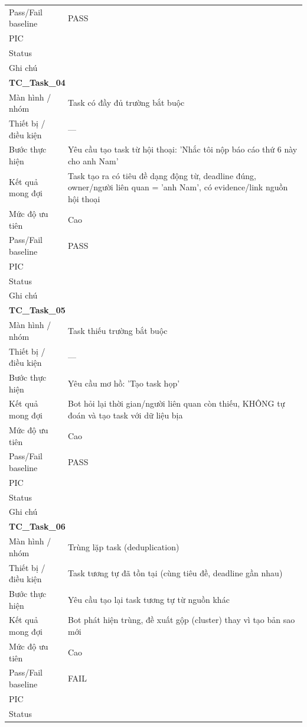 \documentclass[12pt,a4paper]{article}
\begin{document}
\begin{longtable}{p{3.0cm}p{11.5cm}}
Pass/Fail baseline & PASS \\
PIC &  \\
Status &  \\
Ghi chú &  \\
\midrule
\multicolumn{2}{l}{\textbf{TC\_Task\_04}} \\
Màn hình / nhóm & Task có đầy đủ trường bắt buộc \\
Thiết bị / điều kiện & — \\
Bước thực hiện & Yêu cầu tạo task từ hội thoại: 'Nhắc tôi nộp báo cáo thứ 6 này cho anh Nam' \\
Kết quả mong đợi & Task tạo ra có tiêu đề dạng động từ, deadline đúng, owner/người liên quan = 'anh Nam', có evidence/link nguồn hội thoại \\
Mức độ ưu tiên & Cao \\
Pass/Fail baseline & PASS \\
PIC &  \\
Status &  \\
Ghi chú &  \\
\midrule
\multicolumn{2}{l}{\textbf{TC\_Task\_05}} \\
Màn hình / nhóm & Task thiếu trường bắt buộc \\
Thiết bị / điều kiện & — \\
Bước thực hiện & Yêu cầu mơ hồ: 'Tạo task họp' \\
Kết quả mong đợi & Bot hỏi lại thời gian/người liên quan còn thiếu, KHÔNG tự đoán và tạo task với dữ liệu bịa \\
Mức độ ưu tiên & Cao \\
Pass/Fail baseline & PASS \\
PIC &  \\
Status &  \\
Ghi chú &  \\
\midrule
\multicolumn{2}{l}{\textbf{TC\_Task\_06}} \\
Màn hình / nhóm & Trùng lặp task (deduplication) \\
Thiết bị / điều kiện & Task tương tự đã tồn tại (cùng tiêu đề, deadline gần nhau) \\
Bước thực hiện & Yêu cầu tạo lại task tương tự từ nguồn khác \\
Kết quả mong đợi & Bot phát hiện trùng, đề xuất gộp (cluster) thay vì tạo bản sao mới \\
Mức độ ưu tiên & Cao \\
Pass/Fail baseline & FAIL \\
PIC &  \\
Status &  \\

\end{longtable}
\end{document}

